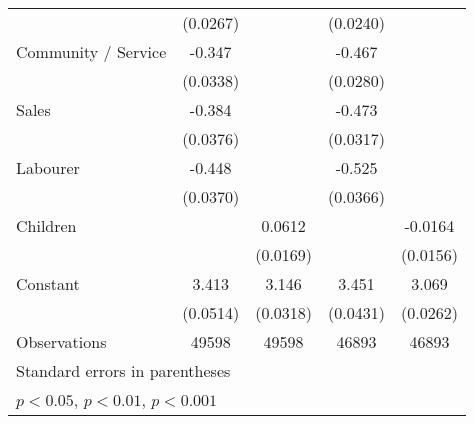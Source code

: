 {\begin{tabular}{l*{4}{c}}
                    &    (0.0267)         &                     &    (0.0240)         &                     \\
[1em]
Community / Service &      -0.347\sym{***}&                     &      -0.467\sym{***}&                     \\
                    &    (0.0338)         &                     &    (0.0280)         &                     \\
[1em]
Sales               &      -0.384\sym{***}&                     &      -0.473\sym{***}&                     \\
                    &    (0.0376)         &                     &    (0.0317)         &                     \\
[1em]
Labourer            &      -0.448\sym{***}&                     &      -0.525\sym{***}&                     \\
                    &    (0.0370)         &                     &    (0.0366)         &                     \\
[1em]
Children            &                     &      0.0612\sym{***}&                     &     -0.0164         \\
                    &                     &    (0.0169)         &                     &    (0.0156)         \\
[1em]
Constant            &       3.413\sym{***}&       3.146\sym{***}&       3.451\sym{***}&       3.069\sym{***}\\
                    &    (0.0514)         &    (0.0318)         &    (0.0431)         &    (0.0262)         \\
\hline
Observations        &       49598         &       49598         &       46893         &       46893         \\
\hline\hline
\multicolumn{5}{l}{\footnotesize Standard errors in parentheses}\\
\multicolumn{5}{l}{\footnotesize \sym{*} \(p<0.05\), \sym{**} \(p<0.01\), \sym{***} \(p<0.001\)}\\
\end{tabular}
}
